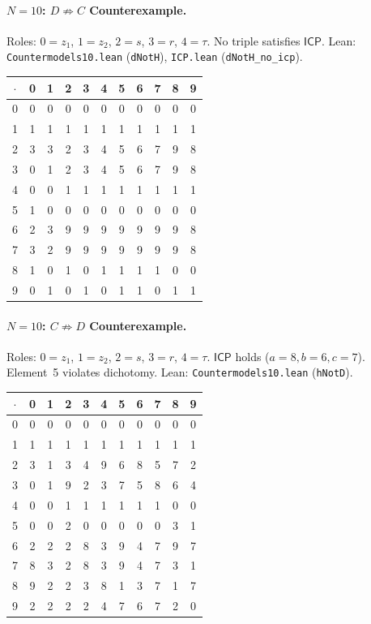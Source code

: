 \documentclass[sigconf,screen]{acmart}
\newcommand{\dotop}{\cdot}
\newcommand{\ICP}{\textsf{ICP}}
\theoremstyle{remark}
\begin{document}
\paragraph{$N\!=\!10$: $D \not\Rightarrow C$ Counterexample.}
Roles: $0 = z_1$, $1 = z_2$, $2 = s$, $3 = r$, $4 = \tau$. No triple satisfies $\ICP$. \quad Lean: \texttt{Countermodels10.lean} (\texttt{dNotH}), \texttt{ICP.lean} (\texttt{dNotH\_no\_icp}).

\medskip
{\footnotesize
\begin{tabular}{c|cccccccccc}
$\dotop$ & 0 & 1 & 2 & 3 & 4 & 5 & 6 & 7 & 8 & 9 \\\hline
0 & 0 & 0 & 0 & 0 & 0 & 0 & 0 & 0 & 0 & 0 \\
1 & 1 & 1 & 1 & 1 & 1 & 1 & 1 & 1 & 1 & 1 \\
2 & 3 & 3 & 2 & 3 & 4 & 5 & 6 & 7 & 9 & 8 \\
3 & 0 & 1 & 2 & 3 & 4 & 5 & 6 & 7 & 9 & 8 \\
4 & 0 & 0 & 1 & 1 & 1 & 1 & 1 & 1 & 1 & 1 \\
5 & 1 & 0 & 0 & 0 & 0 & 0 & 0 & 0 & 0 & 0 \\
6 & 2 & 3 & 9 & 9 & 9 & 9 & 9 & 9 & 9 & 8 \\
7 & 3 & 2 & 9 & 9 & 9 & 9 & 9 & 9 & 9 & 8 \\
8 & 1 & 0 & 1 & 0 & 1 & 1 & 1 & 1 & 0 & 0 \\
9 & 0 & 1 & 0 & 1 & 0 & 1 & 1 & 0 & 1 & 1 \\
\end{tabular}}

\paragraph{$N\!=\!10$: $C \not\Rightarrow D$ Counterexample.}
Roles: $0 = z_1$, $1 = z_2$, $2 = s$, $3 = r$, $4 = \tau$. $\ICP$ holds ($a\!=\!8, b\!=\!6, c\!=\!7$). Element~5 violates dichotomy. \quad Lean: \texttt{Countermodels10.lean} (\texttt{hNotD}).

\medskip
{\footnotesize
\begin{tabular}{c|cccccccccc}
$\dotop$ & 0 & 1 & 2 & 3 & 4 & 5 & 6 & 7 & 8 & 9 \\\hline
0 & 0 & 0 & 0 & 0 & 0 & 0 & 0 & 0 & 0 & 0 \\
1 & 1 & 1 & 1 & 1 & 1 & 1 & 1 & 1 & 1 & 1 \\
2 & 3 & 1 & 3 & 4 & 9 & 6 & 8 & 5 & 7 & 2 \\
3 & 0 & 1 & 9 & 2 & 3 & 7 & 5 & 8 & 6 & 4 \\
4 & 0 & 0 & 1 & 1 & 1 & 1 & 1 & 1 & 0 & 0 \\
5 & 0 & 0 & 2 & 0 & 0 & 0 & 0 & 0 & 3 & 1 \\
6 & 2 & 2 & 2 & 8 & 3 & 9 & 4 & 7 & 9 & 7 \\
7 & 8 & 3 & 2 & 8 & 3 & 9 & 4 & 7 & 3 & 1 \\
8 & 9 & 2 & 2 & 3 & 8 & 1 & 3 & 7 & 1 & 7 \\
9 & 2 & 2 & 2 & 2 & 4 & 7 & 6 & 7 & 2 & 0 \\
\end{tabular}}
\end{document}
